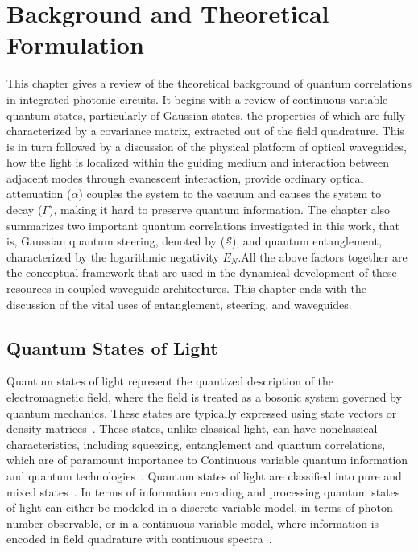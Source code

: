 
\chapter{Background and Theoretical Formulation}

\label{chp2}
This chapter gives a  review of the theoretical background of quantum correlations in integrated photonic circuits. It begins with a review of continuous-variable quantum states, particularly of Gaussian states, the properties of which are fully characterized by a covariance matrix, extracted out of the field quadrature. This is in turn followed by a discussion of the physical platform of optical waveguides, how the light is localized within the guiding medium and interaction between adjacent modes through evanescent interaction, provide ordinary optical attenuation ($\alpha$) couples the system to the vacuum and causes the system to decay ($\Gamma$), making it hard to preserve quantum information. The chapter also summarizes two important quantum correlations investigated in this work, that is, Gaussian quantum steering, denoted by ($\mathcal{S}$), and quantum entanglement, characterized by the logarithmic negativity $E_N$.All the above factors together are the conceptual framework that are used in the dynamical development of these resources in coupled waveguide architectures.
This chapter ends with the discussion of the vital uses of entanglement, steering, and waveguides.
 
\section{Quantum States of Light}
Quantum states of light represent the quantized description of the electromagnetic field, where the field is treated as a bosonic system governed by quantum mechanics. These states are typically expressed using state vectors or density matrices~\cite{WallsMilburn}.
These states, unlike classical light, can have nonclassical characteristics, including squeezing, entanglement and quantum correlations, which are of paramount importance to Continuous variable quantum information and quantum technologies~\cite{Weedbrook2012}. Quantum states of light are classified into pure and mixed states~\cite{WallsMilburn,Weedbrook2012}.
In terms of information encoding and processing quantum states of light can either be modeled in a discrete variable model, in terms of photon-number observable, or in a continuous variable model, where information is encoded in field quadrature with continuous spectra~\cite{BraunsteinVanLoock2005,Weedbrook2012}.
